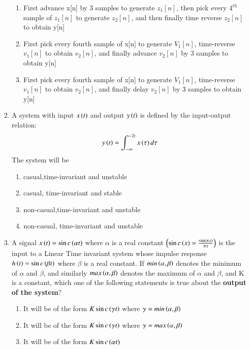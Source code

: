 \documentclass[journal,12pt,onecolumn]{IEEEtran}
\theoremstyle{remark}
\begin{document}
\begin{enumerate}
\begin{enumerate}
          \item First advance x[n] by 3 samples to generate $z_1[n]$, then pick every $4^{th}$ sample of $z_1[n]$ to generate $z_2[n]$, and then finally time reverse $z_2[n]$ to obtain y[n]
          \item First pick every fourth sample of x[n] to generate $V_1[n]$, time-reverse $v_1[n]$ to obtain $v_2[n]$, and finally advance $v_2[n]$ by 3 samples to obtain y[n]
          \item  First pick every fourth sample of x[n] to generate $V_1[n]$, time-reverse $v_1[n]$ to obtain $v_2[n]$, and finally delay $v_2[n]$ by 3 samples to obtain y[n]
      \end{enumerate}
      \item A system with input $x\left(t\right)$ and output $y\left(t\right)$ is defined by the input-output relation:
      \begin{align}
          y\left(t\right)=\int_{-\infty}^{-2t}x\left(\tau\right)d\tau
      \end{align}
      The system will be 
      \begin{enumerate}
          \item casual,time-invariant and unstable
          \item casual, time-invariant and stable
          \item non-casual,time-invariant and unstable
          \item non-casual, time-invariant and unstable
      \end{enumerate}
      \item A signal $x\left(t\right)=\sin c\left(\alpha t\right)$ where $\alpha$ is a real constant $\left(\sin c\left(x\right)=\frac{\sin\left(\pi x\right)}{\pi x}\right)$ is the input to a Linear Time invariant system whose impulse response $h\left(t\right)=\sin c\left(\beta t\right)$ where $\beta$ is a real constant. If $min\left(\alpha,\beta\right)$ denotes the minimum of $\alpha$ and $\beta$, and similarly $max\left(\alpha,\beta\right)$ denotes the maximum of $\alpha$ and $\beta$, and K is a constant, which one of the following statements is true about the \textbf{output of the system}?
      \begin{enumerate}
          \item It will be of the form $K\sin c\left(\gamma t\right)$ where $\gamma=min\left(\alpha,\beta\right)$
           \item It will be of the form $K\sin c\left(\gamma t\right)$ where $\gamma=max\left(\alpha,\beta\right)$
           \item It will be of the form $K \sin c\left(\alpha t\right)$

\end{enumerate}
\end{enumerate}
\end{document}
